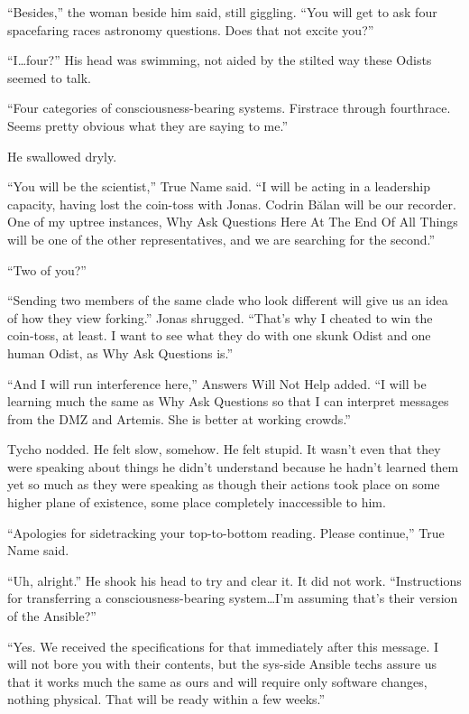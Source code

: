 ``Besides,'' the woman beside him said, still giggling. ``You will get to ask four spacefaring races astronomy questions. Does that not excite you?''

``I\ldots four?'' His head was swimming, not aided by the stilted way these Odists seemed to talk.

``Four categories of consciousness-bearing systems. Firstrace through fourthrace. Seems pretty obvious what they are saying to me.''

He swallowed dryly.

``You will be the scientist,'' True Name said. ``I will be acting in a leadership capacity, having lost the coin-toss with Jonas. Codrin Bălan will be our recorder. One of my uptree instances, Why Ask Questions Here At The End Of All Things will be one of the other representatives, and we are searching for the second.''

``Two of you?''

``Sending two members of the same clade who look different will give us an idea of how they view forking.'' Jonas shrugged. ``That's why I cheated to win the coin-toss, at least. I want to see what they do with one skunk Odist and one human Odist, as Why Ask Questions is.''

``And I will run interference here,'' Answers Will Not Help added. ``I will be learning much the same as Why Ask Questions so that I can interpret messages from the DMZ and Artemis. She is better at working crowds.''

Tycho nodded. He felt slow, somehow. He felt stupid. It wasn't even that they were speaking about things he didn't understand because he hadn't learned them yet so much as they were speaking as though their actions took place on some higher plane of existence, some place completely inaccessible to him.

``Apologies for sidetracking your top-to-bottom reading. Please continue,'' True Name said.

``Uh, alright.'' He shook his head to try and clear it. It did not work. ``Instructions for transferring a consciousness-bearing system\ldots I'm assuming that's their version of the Ansible?''

``Yes. We received the specifications for that immediately after this message. I will not bore you with their contents, but the sys-side Ansible techs assure us that it works much the same as ours and will require only software changes, nothing physical. That will be ready within a few weeks.''

